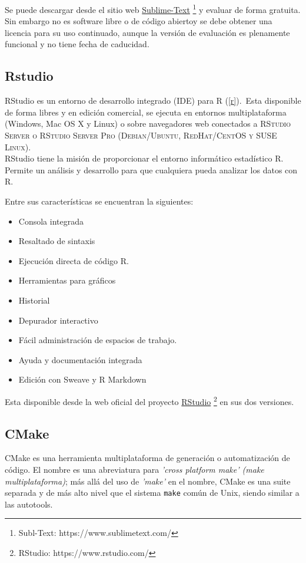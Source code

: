\documentclass[12pt]{book} %
\begin{document}
		Se puede descargar desde el sitio web \href{https://www.sublimetext.com/}{Sublime-Text} 
		\footnote{\scriptsize Subl-Text: https://www.sublimetext.com/}
		y evaluar de forma gratuita. Sin embargo no es software libre o de código abiertoy se debe obtener una licencia 	para su uso
		continuado, aunque la versión de evaluación es plenamente funcional y no tiene fecha de caducidad.
				
		
		
	\subsection{Rstudio \label{RS}}
		RStudio es un entorno de desarrollo integrado (\textsc{IDE}) para R (\ref{r}).\
		Esta disponible de forma libres y en edición comercial, se ejecuta en entornos multiplataforma (Windows, Mac OS X y Linux) o
		sobre navegadores web conectados a \textsc{RStudio Server o RStudio Server Pro (Debian/Ubuntu, RedHat/CentOS y SUSE Linux)}.\\
		
		RStudio tiene la misión de proporcionar el entorno informático estadístico R. Permite un análisis y desarrollo para que 
		cualquiera pueda analizar los datos con R.
		
		Entre sus características se encuentran la siguientes:
		\begin{multicols}{2}
			\begin{itemize}
				\item Consola integrada
				\item Resaltado de sintaxis
				\item Ejecución directa de código R.
				\item Herramientas para gráficos
				\item Historial
				\item Depurador interactivo
				\item Fácil administración de espacios de trabajo.
				\item Ayuda y documentación integrada
				\item Edición con Sweave y R Markdown
			\end{itemize}
		\end{multicols} 
		Esta disponible desde la web oficial del proyecto \href{https://www.rstudio.com/}{RStudio} 
		\footnote{\scriptsize RStudio: https://www.rstudio.com/} en sus dos versiones.\\
		
		
	
	\subsection{CMake \label{CM}}
		CMake es una herramienta multiplataforma de generación o automatización de código. El nombre es una abreviatura para 
		\textit{'cross platform make' (make multiplataforma)}; más allá del uso de \textit{'make'} en el nombre, CMake es una suite separada 
		y de más alto nivel que el sistema \texttt{make} común de Unix, siendo similar a las autotools.
		
\end{document}
